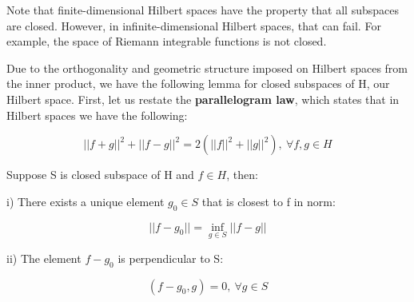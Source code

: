 \documentclass[class=article, crop=false]{standalone}
\begin{document}
		Note that finite-dimensional Hilbert spaces have the property that all subspaces are closed. However, in infinite-dimensional Hilbert spaces, that can fail. For example, the space of Riemann integrable functions is not closed. 

		Due to the orthogonality and geometric structure imposed on Hilbert spaces from the inner product, we have the following lemma for closed subspaces of H, our Hilbert space. First, let us restate the \textbf{parallelogram law}, which states that in Hilbert spaces we have the following:

			$$||f + g||^2 + ||f - g||^2 = 2(||f||^2 + ||g||^2),\ \forall f, g \in H$$

		\begin{lemma}
			Suppose S is closed subspace of H and $f \in H$, then:

			i) There exists a unique element $g_0 \in S$ that is closest to f in norm:

				$$||f - g_0|| = \inf_{g \in S} ||f - g||$$

			ii) The element $f - g_0$ is perpendicular to S:

				$$(f - g_0, g) = 0, \ \forall g \in S$$
		\end{lemma}
\end{document}
